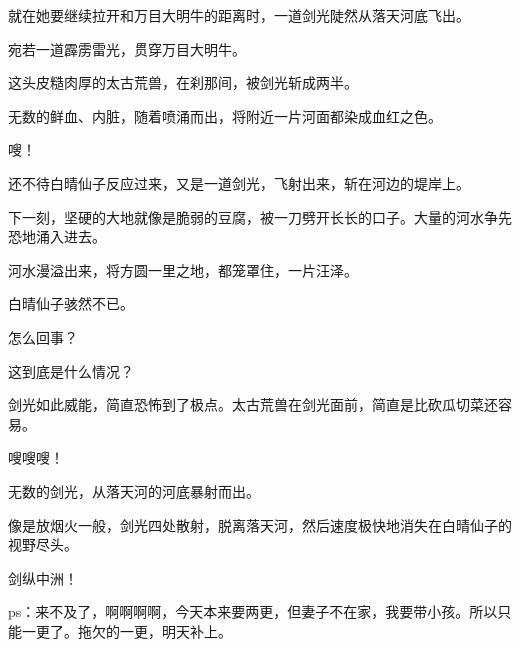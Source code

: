 \begin{this_body}
就在她要继续拉开和万目大明牛的距离时，一道剑光陡然从落天河底飞出。

宛若一道霹雳雷光，贯穿万目大明牛。

这头皮糙肉厚的太古荒兽，在刹那间，被剑光斩成两半。

无数的鲜血、内脏，随着喷涌而出，将附近一片河面都染成血红之色。

嗖！

还不待白晴仙子反应过来，又是一道剑光，飞射出来，斩在河边的堤岸上。

下一刻，坚硬的大地就像是脆弱的豆腐，被一刀劈开长长的口子。大量的河水争先恐地涌入进去。

河水漫溢出来，将方圆一里之地，都笼罩住，一片汪泽。

白晴仙子骇然不已。

怎么回事？

这到底是什么情况？

剑光如此威能，简直恐怖到了极点。太古荒兽在剑光面前，简直是比砍瓜切菜还容易。

嗖嗖嗖！

无数的剑光，从落天河的河底暴射而出。

像是放烟火一般，剑光四处散射，脱离落天河，然后速度极快地消失在白晴仙子的视野尽头。

剑纵中洲！

ps：来不及了，啊啊啊啊，今天本来要两更，但妻子不在家，我要带小孩。所以只能一更了。拖欠的一更，明天补上。

\end{this_body}

